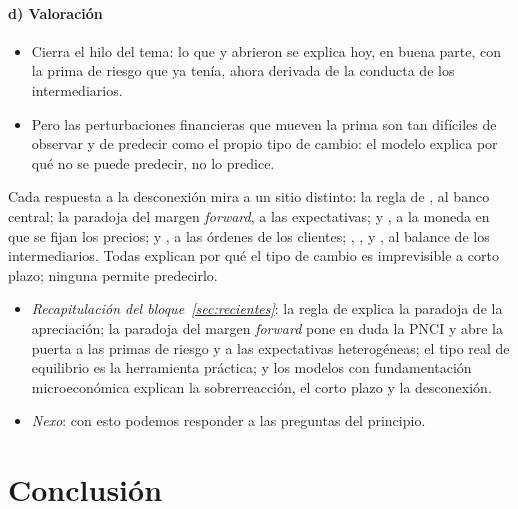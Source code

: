 \documentclass[11pt]{article}
\begin{document}
\paragraph{d) Valoración}
\begin{itemize}
\item Cierra el hilo del tema: lo que  y  abrieron se explica hoy, en buena parte, con la prima de riesgo que  ya tenía, ahora derivada de la conducta de los intermediarios.
\item Pero las perturbaciones financieras que mueven la prima son tan difíciles de observar y de predecir como el propio tipo de cambio: el modelo explica por qué no se puede predecir, no lo predice.
\end{itemize}

\begin{ideaclave}
Cada respuesta a la desconexión mira a un sitio distinto: la regla de , al banco central; la paradoja del margen \emph{forward}, a las expectativas;  y , a la moneda en que se fijan los precios;  y , a las órdenes de los clientes; , ,  y , al balance de los intermediarios. Todas explican por qué el tipo de cambio es imprevisible a corto plazo; ninguna permite predecirlo.
\end{ideaclave}

\begin{itemize}
\item \emph{Recapitulación del bloque~\ref{sec:recientes}}: la regla de  explica la paradoja de la apreciación; la paradoja del margen \emph{forward} pone en duda la PNCI y abre la puerta a las primas de riesgo y a las expectativas heterogéneas; el tipo real de equilibrio es la herramienta práctica; y los modelos con fundamentación microeconómica explican la sobrerreacción, el corto plazo y la desconexión.
\item \emph{Nexo}: con esto podemos responder a las preguntas del principio.
\end{itemize}

\section*{Conclusión}
\end{document}
